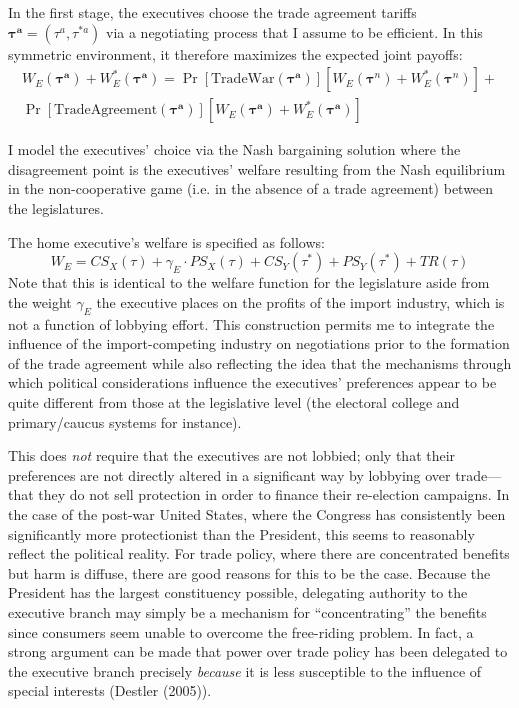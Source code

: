\documentclass[10pt]{article}
\newcommand{\bta}{\bm{\tau^a}}
\newcommand{\ga}{\gamma}
\begin{document}
In the first stage, the executives choose the trade agreement tariffs $\bta=\left(\tau^a,\tau^{*a} \right)$ via a negotiating process that I assume to be efficient. In this symmetric environment, it therefore maximizes the expected joint payoffs:
\begin{multline}
  W_E(\bta) + W_E^*(\bta) = \Pr\left[ \text{TradeWar}(\bta) \right] \left[W_E(\bm{\tau}^{\mathit{n}}) + W_E^*(\bm{\tau}^{\mathit{n}}) \right] + \\ \Pr\left[ \text{TradeAgreement}(\bta) \right] \left[W_E(\bta) + W_E^*(\bta) \right]
  \label{eq:jv}
\end{multline}

I model the executives' choice via the Nash bargaining solution where the disagreement point is the executives' welfare resulting from the Nash equilibrium in the non-cooperative game (i.e. in the absence of a trade agreement) between the legislatures.

The home executive's welfare is specified as follows:
\[
  W_E = \mathit{CS}_X(\tau) + \ga_E \cdot \mathit{PS}_X(\tau) + \mathit{CS}_Y(\tau^*) + \mathit{PS}_Y(\tau^*) + \mathit{TR}(\tau)
\]
Note that this is identical to the welfare function for the legislature aside from the weight $\ga_E$ the executive places on the profits of the import industry, which is not a function of lobbying effort. This construction permits me to integrate the influence of the import-competing industry on negotiations prior to the formation of the trade agreement while also reflecting the idea that the mechanisms through which political considerations influence the executives' preferences appear to be quite different from those at the legislative level (the electoral college and primary/caucus systems for instance).

This does \textit{not} require that the executives are not lobbied; only that their preferences are not directly altered in a significant way by lobbying over trade---that they do not sell protection in order to finance their re-election campaigns. In the case of the post-war United States, where the Congress has consistently been significantly more protectionist than the President, this seems to reasonably reflect the political reality. For trade policy, where there are concentrated benefits but harm is diffuse, there are good reasons for this to be the case. Because the President has the largest constituency possible, delegating authority to the executive branch may simply be a mechanism for ``concentrating'' the benefits since consumers seem unable to overcome the free-riding problem. In fact, a strong argument can be made that power over trade policy has been delegated to the executive branch precisely \textit{because} it is less susceptible to the influence of special interests (Destler (2005)).
\end{document}

